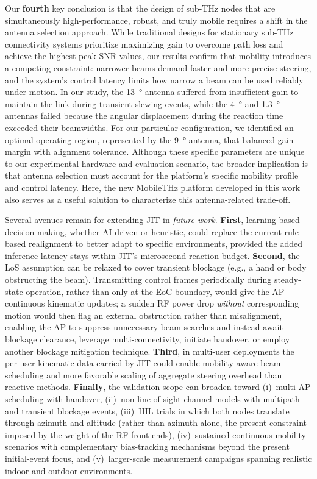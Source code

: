 \documentclass[fleqn,10pt]{wlscirep}
\begin{document}
Our \textbf{fourth} key conclusion is that the design of sub-THz nodes that are simultaneously high-performance, robust, and truly mobile requires a shift in the antenna selection approach. While traditional designs for stationary sub-THz connectivity systems prioritize maximizing gain to overcome path loss and achieve the highest peak SNR values, our results confirm that mobility introduces a competing constraint: narrower beams demand faster and more precise steering, and the system's control latency limits how narrow a beam can be used reliably under motion. In our study, the \SI{13}{\degree} antenna suffered from insufficient gain to maintain the link during transient slewing events, while the \SI{4}{\degree} and \SI{1.3}{\degree} antennas failed because the angular displacement during the reaction time exceeded their beamwidths. For our particular configuration, we identified an optimal operating region, represented by the \SI{9}{\degree} antenna, that balanced gain margin with alignment tolerance. Although these specific parameters are unique to our experimental hardware and evaluation scenario, the broader implication is that antenna selection must account for the platform's specific mobility profile and control latency. Here, the new MobileTHz platform developed in this work also serves as a useful solution to characterize this antenna-related trade-off.

Several avenues remain for extending JIT in \emph{future work}. \textbf{First}, learning-based decision making\cite{10036372}, whether AI-driven or heuristic, could replace the current rule-based realignment to better adapt to specific environments, provided the added inference latency stays within JIT's microsecond reaction budget. \textbf{Second}, the LoS assumption can be relaxed to cover transient blockage (e.g., a hand or body obstructing the beam). Transmitting control frames periodically during steady-state operation, rather than only at the EoC boundary, would give the AP continuous kinematic updates; a sudden RF power drop \emph{without} corresponding motion would then flag an external obstruction rather than misalignment, enabling the AP to suppress unnecessary beam searches and instead await blockage clearance, leverage multi-connectivity, initiate handover, or employ another blockage mitigation technique. \textbf{Third}, in multi-user deployments the per-user kinematic data carried by JIT could enable mobility-aware beam scheduling and more favorable scaling of aggregate steering overhead than reactive methods. \textbf{Finally}, the validation scope can broaden toward (i)~multi-AP scheduling with handover, (ii)~non-line-of-sight channel models with multipath and transient blockage events, (iii)~HIL trials in which both nodes translate through azimuth and altitude (rather than azimuth alone, the present constraint imposed by the weight of the RF front-ends), (iv)~sustained continuous-mobility scenarios with complementary bias-tracking mechanisms beyond the present initial-event focus, and (v)~larger-scale measurement campaigns spanning realistic indoor and outdoor environments.
\end{document}
